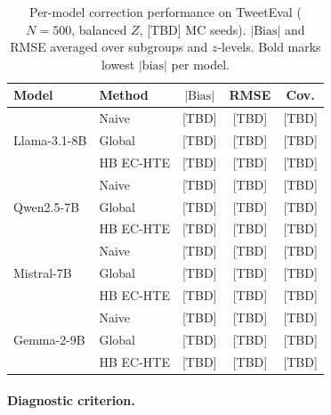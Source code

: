 \begin{table}[t]
\centering
\caption{Per-model correction performance on TweetEval ($N{=}500$, balanced $Z$, [TBD] MC seeds). $|\text{Bias}|$ and RMSE averaged over subgroups and $z$-levels. Bold marks lowest $|\text{bias}|$ per model.}
\label{tab:multi_llm_correction}
\small
\begin{tabular}{ll ccc}
\toprule
Model & Method & $|\text{Bias}|$ & RMSE & Cov. \\
\midrule
\multirow{3}{*}{Llama-3.1-8B}
 & Naive  & [TBD] & [TBD] & [TBD] \\
 & Global & [TBD] & [TBD] & [TBD] \\
 & HB EC-HTE & [TBD] & [TBD] & [TBD] \\
\midrule
\multirow{3}{*}{Qwen2.5-7B}
 & Naive  & [TBD] & [TBD] & [TBD] \\
 & Global & [TBD] & [TBD] & [TBD] \\
 & HB EC-HTE & [TBD] & [TBD] & [TBD] \\
\midrule
\multirow{3}{*}{Mistral-7B}
 & Naive  & [TBD] & [TBD] & [TBD] \\
 & Global & [TBD] & [TBD] & [TBD] \\
 & HB EC-HTE & [TBD] & [TBD] & [TBD] \\
\midrule
\multirow{3}{*}{Gemma-2-9B}
 & Naive  & [TBD] & [TBD] & [TBD] \\
 & Global & [TBD] & [TBD] & [TBD] \\
 & HB EC-HTE & [TBD] & [TBD] & [TBD] \\
\bottomrule
\end{tabular}
\end{table}


\paragraph{Diagnostic criterion.}
